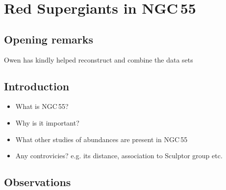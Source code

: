 \chapter{Red Supergiants in NGC\,55}





\section{Opening remarks} %
\label{sec:opening_remarks}

Owen has kindly helped reconstruct and combine the data sets


\section{Introduction} %
\label{sec:introduction}

\begin{itemize}
    \item What is NGC\,55?
    \item Why is it important?
    \item What other studies of abundances are present in NGC\,55
    \item Any controvicies? e.g. its distance, association to Sculptor group etc.
\end{itemize}


\section{Observations} %
\label{sec:observations}


